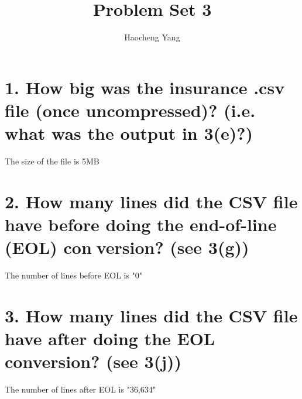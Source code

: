 \documentclass{article}
\title{Problem Set 3}
\author{Haocheng Yang}
\begin{document}
\maketitle


\section{1. How big was the insurance .csv file (once uncompressed)? (i.e. what was the
output in 3(e)?)}

The size of the file is 5MB

\section{2. How many lines did the CSV file have before doing the end-of-line (EOL) conversion? (see 3(g))}
The number of lines before EOL is "0"


\section{3. How many lines did the CSV file have after doing the EOL conversion? (see 3(j))}

The number of lines after EOL is "36,634" 
\end{document}
